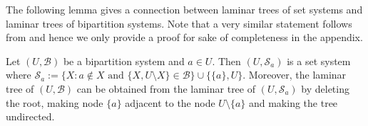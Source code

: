 \documentclass{lmcs} %
\begin{document}
The following lemma gives a connection between laminar trees of set systems and laminar trees of bipartition systems. Note that a very similar statement follows from \cite[Lemma 1.14]{raoThesis} and hence we only provide a proof for sake of completeness in the appendix.
\begin{lem}\label{prop:bipartitiveVSpartitive}
    Let $(U,\mathcal{B})$ be a bipartition system and $a\in U$.
    Then $(U, \mathcal{S}_a)$ is a set system where $\mathcal{S}_a:=\{X: a\notin X \text{ and } \{X,U\setminus X\} \in \mathcal{B}\}\cup \{\{a\},U\}$.
    Moreover, the laminar tree of $(U,\mathcal{B})$ can be obtained from the laminar tree of $(U,\mathcal{S}_a)$ by deleting the root, making node $\{a\}$ adjacent to the node $U\setminus\{a\}$ and making the tree undirected.
\end{lem}
\end{document}
